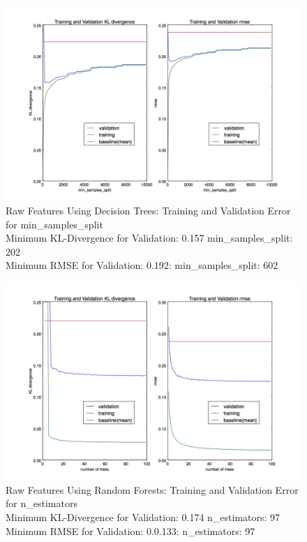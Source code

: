 \documentclass[10pt]{article}
\begin{document}
\begin{figure}
\begin{center}
\includegraphics[scale=0.4]{images/Raw_Features_Decision_Tree_min_samples_split.jpg}
\caption{Raw Features Using Decision Trees: Training and Validation Error for min\_samples\_split \\
         Minimum KL-Divergence for Validation: 0.157 min\_samples\_split: 202 \\
         Minimum RMSE for Validation: 0.192: min\_samples\_split: 602}
\label{fig:rawdreval}
\end{center}
\end{figure}


\begin{figure}
\begin{center}
\includegraphics[scale=0.4]{images/Raw_Features_Random_Forest_n_estimators.jpg}
\caption{Raw Features Using Random Forests: Training and Validation Error for n\_estimators \\
         Minimum KL-Divergence for Validation: 0.174 n\_estimators: 97 \\
         Minimum RMSE for Validation: 0.0.133: n\_estimators: 97}
\label{fig:rawdreval}
\end{center}
\end{figure}
\end{document}
